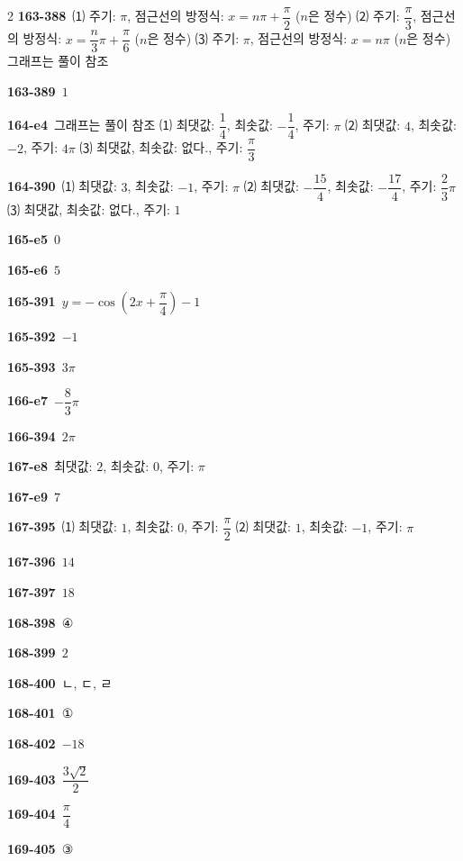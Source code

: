 \documentclass[10pt,a4paper]{article}
\begin{document}
\begin{multicols}{2}
\noindent\textbf{163-388}\ ⑴ 주기: $\pi$, 점근선의 방정식: $x=n\pi+\dfrac{\pi}{2}$ ($n$은 정수) \quad ⑵ 주기: $\dfrac{\pi}{3}$, 점근선의 방정식: $x=\dfrac{n}{3}\pi+\dfrac{\pi}{6}$ ($n$은 정수) \quad ⑶ 주기: $\pi$, 점근선의 방정식: $x=n\pi$ ($n$은 정수) \quad 그래프는 풀이 참조\par
\noindent\textbf{163-389}\ $1$\par
\noindent\textbf{164-e4}\ 그래프는 풀이 참조 \quad ⑴ 최댓값: $\dfrac{1}{4}$, 최솟값: $-\dfrac{1}{4}$, 주기: $\pi$ \quad ⑵ 최댓값: $4$, 최솟값: $-2$, 주기: $4\pi$ \quad ⑶ 최댓값, 최솟값: 없다., 주기: $\dfrac{\pi}{3}$\par
\noindent\textbf{164-390}\ ⑴ 최댓값: $3$, 최솟값: $-1$, 주기: $\pi$ \quad ⑵ 최댓값: $-\dfrac{15}{4}$, 최솟값: $-\dfrac{17}{4}$, 주기: $\dfrac{2}{3}\pi$ \quad ⑶ 최댓값, 최솟값: 없다., 주기: $1$\par
\noindent\textbf{165-e5}\ $0$\par
\noindent\textbf{165-e6}\ $5$\par
\noindent\textbf{165-391}\ $y=-\cos\left(2x+\dfrac{\pi}{4}\right)-1$\par
\noindent\textbf{165-392}\ $-1$\par
\noindent\textbf{165-393}\ $3\pi$\par
\noindent\textbf{166-e7}\ $-\dfrac{8}{3}\pi$\par
\noindent\textbf{166-394}\ $2\pi$\par
\noindent\textbf{167-e8}\ 최댓값: $2$, 최솟값: $0$, 주기: $\pi$\par
\noindent\textbf{167-e9}\ $7$\par
\noindent\textbf{167-395}\ ⑴ 최댓값: $1$, 최솟값: $0$, 주기: $\dfrac{\pi}{2}$ \quad ⑵ 최댓값: $1$, 최솟값: $-1$, 주기: $\pi$\par
\noindent\textbf{167-396}\ $14$\par
\noindent\textbf{167-397}\ $18$\par
\noindent\textbf{168-398}\ ④\par
\noindent\textbf{168-399}\ $2$\par
\noindent\textbf{168-400}\ ㄴ, ㄷ, ㄹ\par
\noindent\textbf{168-401}\ ①\par
\noindent\textbf{168-402}\ $-18$\par
\noindent\textbf{169-403}\ $\dfrac{3\sqrt{2}}{2}$\par
\noindent\textbf{169-404}\ $\dfrac{\pi}{4}$\par
\noindent\textbf{169-405}\ ③\par

\end{multicols}
\end{document}
